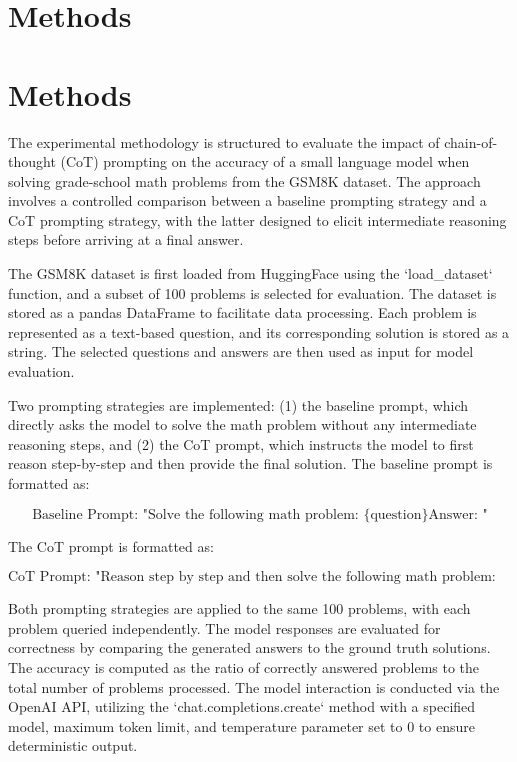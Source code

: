 \documentclass{article}
\begin{document}
\section{Methods}
\section*{Methods}

The experimental methodology is structured to evaluate the impact of chain-of-thought (CoT) prompting on the accuracy of a small language model when solving grade-school math problems from the GSM8K dataset. The approach involves a controlled comparison between a baseline prompting strategy and a CoT prompting strategy, with the latter designed to elicit intermediate reasoning steps before arriving at a final answer.

The GSM8K dataset is first loaded from HuggingFace using the `load_dataset` function, and a subset of 100 problems is selected for evaluation. The dataset is stored as a pandas DataFrame to facilitate data processing. Each problem is represented as a text-based question, and its corresponding solution is stored as a string. The selected questions and answers are then used as input for model evaluation.

Two prompting strategies are implemented: (1) the baseline prompt, which directly asks the model to solve the math problem without any intermediate reasoning steps, and (2) the CoT prompt, which instructs the model to first reason step-by-step and then provide the final solution. The baseline prompt is formatted as:

$$
\text{Baseline Prompt: } \text{"Solve the following math problem: \{question\} Answer: "}
$$

The CoT prompt is formatted as:

$$
\text{CoT Prompt: } \text{"Reason step by step and then solve the following math problem: \{question\} Answer: "}
$$

Both prompting strategies are applied to the same 100 problems, with each problem queried independently. The model responses are evaluated for correctness by comparing the generated answers to the ground truth solutions. The accuracy is computed as the ratio of correctly answered problems to the total number of problems processed. The model interaction is conducted via the OpenAI API, utilizing the `chat.completions.create` method with a specified model, maximum token limit, and temperature parameter set to 0 to ensure deterministic output.
\end{document}
